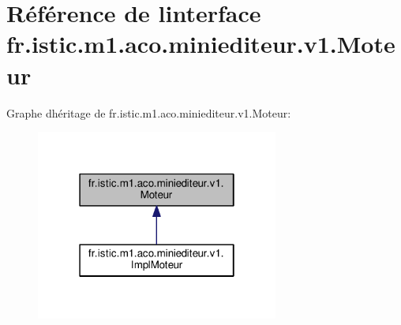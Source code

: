 \hypertarget{interfacefr_1_1istic_1_1m1_1_1aco_1_1miniediteur_1_1v1_1_1Moteur}{}\section{Référence de l\textquotesingle{}interface fr.\+istic.\+m1.\+aco.\+miniediteur.\+v1.\+Moteur}
\label{interfacefr_1_1istic_1_1m1_1_1aco_1_1miniediteur_1_1v1_1_1Moteur}


Graphe d\textquotesingle{}héritage de fr.\+istic.\+m1.\+aco.\+miniediteur.\+v1.\+Moteur\+:
\nopagebreak
\begin{figure}[H]
\begin{center}
\leavevmode
\includegraphics[width=226pt]{interfacefr_1_1istic_1_1m1_1_1aco_1_1miniediteur_1_1v1_1_1Moteur__inherit__graph}
\end{center}
\end{figure}
